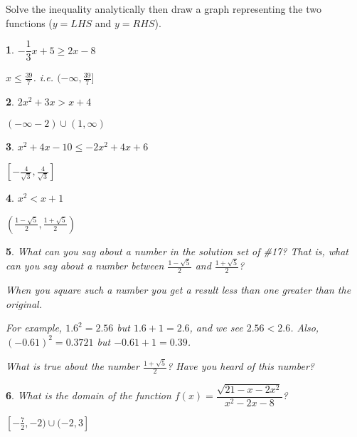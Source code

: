 \documentclass{amsbook}
\newtheorem{exc}{}
\newenvironment{ex}{\begin{exc}\normalfont}{\end{exc}}
\numberwithin{section}{chapter}
\numberwithin{equation}{chapter}
\begin{document}
	Solve the inequality analytically then draw a graph representing the two functions ($y=LHS$ and $y=RHS$).
	
	\begin{multicols}{2}
		\begin{ex}
			$-\dfrac{1}{3}x+5 \geq 2x-8$
			\begin{sol}
				$x \leq \frac{39}{7}$. i.e. $(-\infty, \frac{39}{7}] $
			\end{sol}
		\end{ex}
	
		\begin{ex}
		$2x^2+3x > x+4$
	\begin{sol}
		$ (-\infty -2)\cup (1,\infty) $
	\end{sol}
\end{ex}

		\begin{ex}
	$x^2+4x-10 \leq -2x^2+4x+6$
	\begin{sol}
		$ \left[ -\frac{4}{\sqrt{3}}, \frac{4}{\sqrt{3}} \right] $
	\end{sol}
\end{ex}

		\begin{ex} \label{goldenInequ}
	$x^2 < x+1$
	\begin{sol}
		$\left(  \frac{1-\sqrt{5}}{2}, \frac{1+\sqrt{5}}{2} \right)$
	\end{sol}
\end{ex}
		
	\end{multicols}

\begin{ex}
	What can you say about a number in the solution set of \#17? That is, what can you say about a number between $\frac{1-\sqrt{5}}{2}$ and $\frac{1+\sqrt{5}}{2}$?
	\begin{sol}
		When you square such a number you get a result less than one greater than the original.
		
		For example, $1.6^2 = 2.56$ but $1.6+1=2.6$, and we see $2.56 < 2.6$. Also, $(-0.61)^2 = 0.3721$ but $-0.61+1 = 0.39$. 
		
		What is true about the number $\frac{1+\sqrt{5}}{2}$? Have you heard of this number?
	\end{sol}
\end{ex}

\begin{ex}
	What is the domain of the function $f(x) = \dfrac{\sqrt{21-x-2x^2}}{x^2-2x-8}$?
	\begin{sol}
		$\left[-\frac{7}{2}, -2)\cup(-2, 3 \right]$
	\end{sol}
\end{ex}
\end{document}
